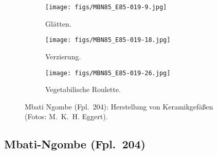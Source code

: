 \begin{figure*}[p]
\begin{subfigure}[t]{0.32\textwidth}
		\centering
		\texttt{[image: figs/MBN85\_E85-019-9.jpg]}
		\caption{Glätten.}
		\label{fig:MBN85_Töpferei_j}
	\end{subfigure}
	\begin{subfigure}[t]{0.32\textwidth}
		\centering
		\texttt{[image: figs/MBN85\_E85-019-18.jpg]}
		\caption{Verzierung.}
		\label{fig:MBN85_Töpferei_k}
	\end{subfigure}
	\begin{subfigure}[t]{0.32\textwidth}
		\centering
		\texttt{[image: figs/MBN85\_E85-019-26.jpg]}
		\caption{Vegetabilische Roulette.}
		\label{fig:MBN85_Töpferei_l}
	\end{subfigure}
	\caption{Mbati Ngombe (Fpl.~204): Herstellung von Keramikgefäßen\\(Fotos: M.~K.~H. Eggert).}
	\label{fig:MBN85_Töpferei}
\end{figure*}

\subsection*{Mbati-Ngombe (Fpl.~204)}\label{sec:MBN_Herstellung}


